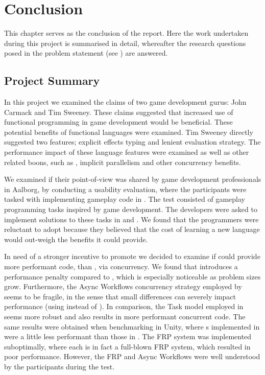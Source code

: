 \chapter{Conclusion}
This chapter serves as the conclusion of the report. Here the work undertaken during this project is summarised in detail, whereafter the research questions posed in the problem statement (see ) are answered.

\section{Project Summary}
In this project we examined the claims of two game development gurus: John Carmack and Tim Sweeney. These claims suggested that increased use of functional programming in game development would be beneficial. These potential benefits of functional languages were examined. Tim Sweeney directly suggested two features; explicit effects typing and lenient evaluation strategy. The performance impact of these language features were examined as well as other related boons, such as , implicit parallelism and other concurrency benefits.

We examined if their point-of-view was shared by game development professionals in Aalborg, by conducting a usability evaluation, where the participants were tasked with implementing gameplay code in \fs. The test consisted of gameplay programming tasks inspired by game development. The developers were asked to implement solutions to these tasks in \fs and \cs. We found that the programmers were reluctant to adopt \fs because they believed that the cost of learning a new language would out-weigh the benefits it could provide.

In need of a stronger incentive to promote \fs we decided to examine if \fs could provide more performant code, than \cs, via concurrency. We found that \fs introduces a performance penalty compared to \cs, which is especially noticeable as problem sizes grow. Furthermore, the Async Workflows concurrency strategy employed by \fs seems to be fragile, in the sense that small differences can severely impact performance (using  instead of ). In comparison, the Task model employed in \cs seems more robust and also results in more performant concurrent code. The same results were obtained when benchmarking \fs in Unity, where s implemented in \fs were a little less performant than those in \cs. The \gls{FRP} system was implemented suboptimally, where each  is in fact a full-blown \gls{FRP} system, which resulted in poor performance. However, the \gls{FRP} and Async Workflows were well understood by the participants during the test.

